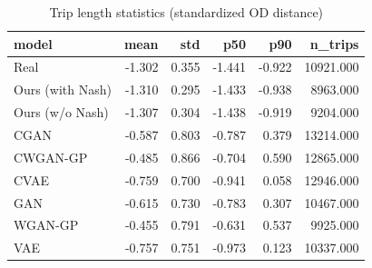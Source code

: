 \begin{table}[t]
\centering
\caption{Trip length statistics (standardized OD distance)}
\label{tab:trip_length}
\begin{tabular}{lrrrrr}
\toprule
model & mean & std & p50 & p90 & n\_trips \\
\midrule
Real & -1.302 & 0.355 & -1.441 & -0.922 & 10921.000 \\
Ours (with Nash) & -1.310 & 0.295 & -1.433 & -0.938 & 8963.000 \\
Ours (w/o Nash) & -1.307 & 0.304 & -1.438 & -0.919 & 9204.000 \\
CGAN & -0.587 & 0.803 & -0.787 & 0.379 & 13214.000 \\
CWGAN-GP & -0.485 & 0.866 & -0.704 & 0.590 & 12865.000 \\
CVAE & -0.759 & 0.700 & -0.941 & 0.058 & 12946.000 \\
GAN & -0.615 & 0.730 & -0.783 & 0.307 & 10467.000 \\
WGAN-GP & -0.455 & 0.791 & -0.631 & 0.537 & 9925.000 \\
VAE & -0.757 & 0.751 & -0.973 & 0.123 & 10337.000 \\
\bottomrule
\end{tabular}
\end{table}